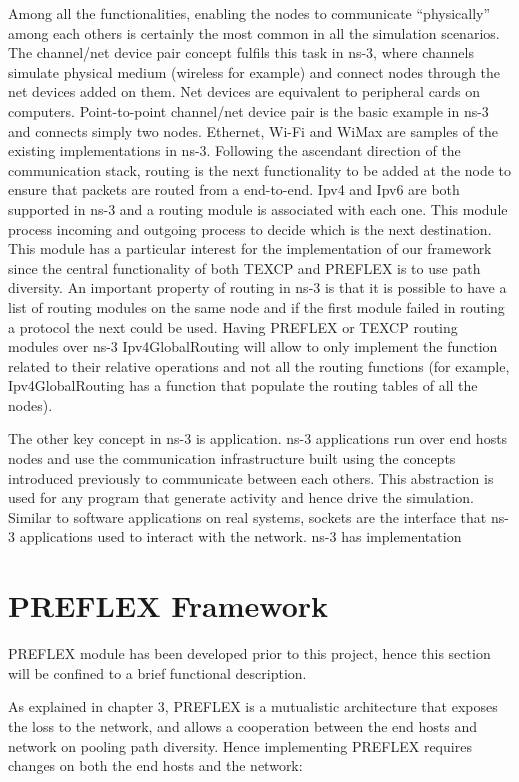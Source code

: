 Among all the functionalities, enabling the nodes to communicate “physically” among each others is certainly the most common in all the simulation scenarios. The channel/net device pair concept fulfils this task in ns-3, where channels simulate physical medium (wireless for example) and connect nodes through the net devices added on them. Net devices are equivalent to peripheral cards on computers. Point-to-point channel/net device pair is the basic example in ns-3 and connects simply two nodes. Ethernet, Wi-Fi and WiMax are samples of the existing implementations in ns-3. Following the ascendant direction of the communication stack, routing is the next functionality to be added at the node to ensure that packets are routed from a end-to-end. Ipv4 and Ipv6 are both supported in ns-3 and a routing module is associated with each one. This module process incoming and outgoing process to decide which is the next destination. This module has a particular interest for the implementation of our framework since the central functionality of both TEXCP and PREFLEX is to use path diversity. An important property of routing in ns-3 is that it is possible to have a list of routing modules on the same node and if the first module failed in routing a protocol the next could be used. Having PREFLEX or TEXCP routing modules over ns-3 Ipv4GlobalRouting will allow to only implement the function related to their relative operations and not all the routing functions (for example, Ipv4GlobalRouting has a function that populate the routing tables of all the nodes).  

The other key concept in ns-3 is application. ns-3 applications run over end hosts nodes and use the communication infrastructure built using the concepts introduced previously to communicate between each others. This abstraction is used for any program that generate activity and hence drive the simulation. Similar to software applications on real systems, sockets are the interface that ns-3 applications used to interact with the network. ns-3 has implementation 
 
\section{PREFLEX Framework}
PREFLEX module has been developed prior to this project, hence this section will be confined to a brief functional description.

As explained in chapter 3, PREFLEX is a mutualistic architecture that exposes the loss to the network, and allows a cooperation between the end hosts and network on pooling path diversity. Hence implementing PREFLEX requires changes on both the end hosts and the network: 


